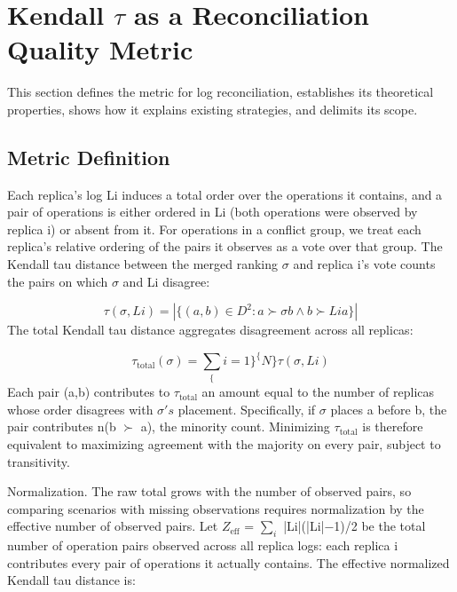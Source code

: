 \documentclass[11pt]{article}
\begin{document}
\section{Kendall $\tau $ as a Reconciliation Quality Metric}
This section defines the metric for log reconciliation, establishes its theoretical properties, shows how it explains existing strategies, and delimits its scope.

\subsection{Metric Definition}
Each replica's log Li induces a total order over the operations it contains, and a pair of operations is either ordered in Li (both operations were observed by replica i) or absent from it. For operations in a conflict group, we treat each replica's relative ordering of the pairs it observes as a vote over that group. The Kendall tau distance between the merged ranking $\sigma $ and replica i's vote counts the pairs on which $\sigma $ and Li disagree:

\[ \tau (\sigma , Li) = |\{ (a,b) \in  D^{2} : a \succ  \sigma  b \wedge  b \succ  Li a \}| \]
The total Kendall tau distance aggregates disagreement across all replicas:

\[ \tau _{\mathrm{total}}(\sigma ) = \sum _\{i=1\}^\{N\} \tau (\sigma , Li) \]
Each pair (a,b) contributes to $\tau _{\mathrm{total}}$ an amount equal to the number of replicas whose order disagrees with $\sigma 's$ placement. Specifically, if $\sigma $ places a before b, the pair contributes n(b $\succ $ a), the minority count. Minimizing $\tau _{\mathrm{total}}$ is therefore equivalent to maximizing agreement with the majority on every pair, subject to transitivity.

Normalization. The raw total grows with the number of observed pairs, so comparing scenarios with missing observations requires normalization by the effective number of observed pairs. Let $Z_{\mathrm{eff}}$ = $\sum_{i} $ |Li|(|Li|−1)/2 be the total number of operation pairs observed across all replica logs: each replica i contributes every pair of operations it actually contains. The effective normalized Kendall tau distance is:
\end{document}

